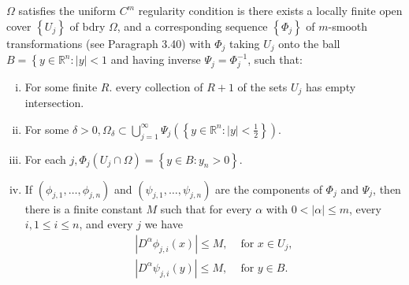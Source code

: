 \begin{para}
  $\Omega$ satisfies the uniform $C^m$ regularity condition is there exists a locally finite open cover $\left\{U_j\right\}$ of bdry $\Omega$, and a corresponding sequence $\left\{\Phi_j\right\}$ of $m$-smooth transformations (see Paragraph 3.40) with $\Phi_j$ taking $U_j$ onto the ball $B=\left\{y \in \mathbb{R}^n:|y|<1\right.$ and having inverse $\Psi_j=\Phi_j^{-1}$, such that:
  \begin{enumerate}[(i)]
    \item For some finite $R$. every collection of $R+1$ of the sets $U_j$ has empty intersection.
    \item For some $\delta>0, \Omega_\delta \subset \bigcup_{j=1}^{\infty} \Psi_j\left(\left\{y \in \mathbb{R}^n:|y|<\frac{1}{2}\right\}\right)$.
    \item For each $j, \Phi_j\left(U_j \cap \Omega\right)=\left\{y \in B: y_n>0\right\}$.
    \item If $\left(\phi_{j, 1}, \ldots, \phi_{j, n}\right)$ and $\left(\psi_{j, 1}, \ldots, \psi_{j, n}\right)$ are the components of $\Phi_j$ and $\Psi_j$, then there is a finite constant $M$ such that for every $\alpha$ with $0<|\alpha| \leq m$, every $i, 1 \leq i \leq n$, and every $j$ we have
    \[
    \begin{array}{ll}
    \left|D^\alpha \phi_{j, i}(x)\right| \leq M, & \text { for } x \in U_j, \\
    \left|D^\alpha \psi_{j, i}(y)\right| \leq M, & \text { for } y \in B .
    \end{array}
    \]
  \end{enumerate}
\end{para}


